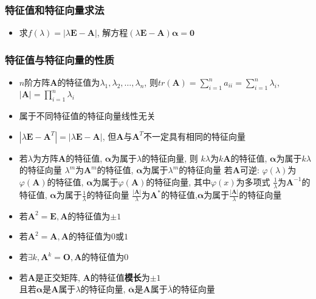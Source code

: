 \documentclass{article}
\begin{document}
			\subsubsection{特征值和特征向量求法}
				\begin{itemize}
					\item 求$f(\lambda )=|\lambda \boldsymbol{E}-\boldsymbol{A}|$, 解方程$(\lambda \boldsymbol{E}-\boldsymbol{A})\boldsymbol{\alpha}=\mathbf{0}$
				\end{itemize}
			\subsubsection{特征值与特征向量的性质}
				\begin{itemize}
					\item $n$阶方阵$\boldsymbol A$的特征值为$\lambda _1,\lambda _2,\dots ,\lambda _n$, 则$tr(\boldsymbol A)=\sum \limits _{i=1}^n a _{ii}=\sum \limits _{i=1}^n \lambda _i$, $|\boldsymbol A|=\prod \limits _{i=1}^n \lambda _i$
					\item 属于不同特征值的特征向量线性无关
					\item $|\lambda \boldsymbol E-\boldsymbol A^T|=|\lambda \boldsymbol E-\boldsymbol A|$, 但$\boldsymbol A$与$\boldsymbol A^T$不一定具有相同的特征向量
					\item 若$\lambda$为方阵$\boldsymbol A$的特征值, $\boldsymbol\alpha$为属于$\lambda$的特征向量, 则
						\subitem $k\lambda$为$k\boldsymbol A$的特征值, $\boldsymbol\alpha$为属于$k\lambda$的特征向量
						\subitem $\lambda ^m$为$\boldsymbol A^m$的特征值, $\boldsymbol\alpha$为属于$\lambda ^m$的特征向量
						\subitem 若$\boldsymbol A$可逆:
						\subitem $\varphi (\lambda)$为$\varphi (\boldsymbol A)$的特征值, $\boldsymbol\alpha$为属于$\varphi (\boldsymbol A)$的特征向量, 其中$\varphi (x)$为多项式
							\subsubitem $\frac{1}{\lambda}$为$\boldsymbol A^{-1}$的特征值, $\boldsymbol\alpha$为属于$\frac{1}{\lambda}$的特征向量
							\subsubitem $\frac{|\boldsymbol A|}{\lambda}$为$\boldsymbol A^*$的特征值,$\boldsymbol\alpha$为属于$\frac{|\boldsymbol A|}{\lambda}$的特征向量
					\item 若$\boldsymbol A^2=\boldsymbol E, \boldsymbol A$的特征值为$\pm1$
					\item 若$\boldsymbol A^2=\boldsymbol A, \boldsymbol A$的特征值为$0$或$1$
					\item 若$\exists k, \boldsymbol A^k=\boldsymbol O, \boldsymbol A$的特征值为$0$
					\item 若$\boldsymbol A$是正交矩阵, $\boldsymbol A$的特征值\textbf{模长}为$\pm1$\\且若$\boldsymbol\alpha$是$\boldsymbol A$属于$\lambda$的特征向量, $\boldsymbol{\overline{\alpha}}$是$\boldsymbol A$属于$\overline{\lambda}$的特征向量
				\end{itemize}
\end{document}
